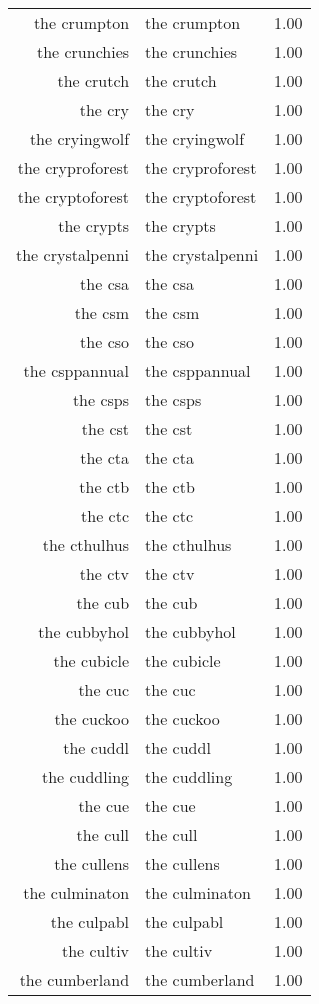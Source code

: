 \begin{table}[ht]
\begin{tabular}{rlr}
  the crumpton & the crumpton & 1.00 \\ 
  the crunchies & the crunchies & 1.00 \\ 
  the crutch & the crutch & 1.00 \\ 
  the cry & the cry & 1.00 \\ 
  the cryingwolf & the cryingwolf & 1.00 \\ 
  the cryproforest & the cryproforest & 1.00 \\ 
  the cryptoforest & the cryptoforest & 1.00 \\ 
  the crypts & the crypts & 1.00 \\ 
  the crystalpenni & the crystalpenni & 1.00 \\ 
  the csa & the csa & 1.00 \\ 
  the csm & the csm & 1.00 \\ 
  the cso & the cso & 1.00 \\ 
  the csppannual & the csppannual & 1.00 \\ 
  the csps & the csps & 1.00 \\ 
  the cst & the cst & 1.00 \\ 
  the cta & the cta & 1.00 \\ 
  the ctb & the ctb & 1.00 \\ 
  the ctc & the ctc & 1.00 \\ 
  the cthulhus & the cthulhus & 1.00 \\ 
  the ctv & the ctv & 1.00 \\ 
  the cub & the cub & 1.00 \\ 
  the cubbyhol & the cubbyhol & 1.00 \\ 
  the cubicle & the cubicle & 1.00 \\ 
  the cuc & the cuc & 1.00 \\ 
  the cuckoo & the cuckoo & 1.00 \\ 
  the cuddl & the cuddl & 1.00 \\ 
  the cuddling & the cuddling & 1.00 \\ 
  the cue & the cue & 1.00 \\ 
  the cull & the cull & 1.00 \\ 
  the cullens & the cullens & 1.00 \\ 
  the culminaton & the culminaton & 1.00 \\ 
  the culpabl & the culpabl & 1.00 \\ 
  the cultiv & the cultiv & 1.00 \\ 
  the cumberland & the cumberland & 1.00 \\ 

\end{tabular}
\end{table}
